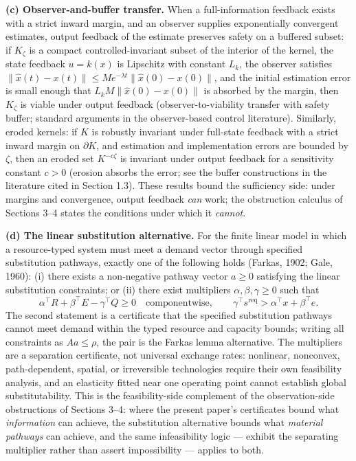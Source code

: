 \documentclass[11pt]{article}
\theoremstyle{definition}
\begin{document}
\textbf{(c) Observer-and-buffer transfer.} When a full-information
feedback exists with a strict inward margin, and an observer supplies
exponentially convergent estimates, output feedback of the estimate
preserves safety on a buffered subset: if \(K_\zeta\) is a compact controlled-invariant subset of the interior of the kernel, the state
feedback \(u = k(x)\) is Lipschitz with constant \(L_k\), the observer satisfies \(\|\hat x(t) - x(t)\| \le M e^{-\lambda t}\|\hat x(0) - x(0)\|\), and
the initial estimation error is small enough that
\(L_k M \|\hat x(0) - x(0)\|\) is absorbed by the margin, then \(K_\zeta\) is viable under output feedback (observer-to-viability
transfer with safety buffer; standard arguments in the observer-based
control literature). Similarly, eroded kernels: if \(K\) is robustly
invariant under full-state feedback with a strict inward margin on
\(\partial K\), and estimation and implementation errors are bounded by \(\zeta\), then an eroded set \(K^{-c\zeta}\) is invariant
under output feedback for a sensitivity constant \(c > 0\) (erosion
absorbs the error; see the buffer constructions in the literature cited in Section 1.3). These results bound the sufficiency side: under margins and convergence, output feedback \emph{can} work; the obstruction calculus
of Sections 3--4 states the conditions under which it \emph{cannot}.

\textbf{(d) The linear substitution alternative.} For the finite linear
model in which a resource-typed system must meet a demand vector through specified substitution pathways, exactly one of the following holds
(Farkas, 1902; Gale, 1960): (i) there exists a non-negative pathway
vector \(a \ge 0\) satisfying the linear substitution constraints; or
(ii) there exist multipliers \(\alpha, \beta, \gamma \ge 0\) such that
\[\alpha^\top R + \beta^\top E - \gamma^\top Q \ge 0 \quad\text{componentwise},\qquad \gamma^\top s^{\mathrm{req}} > \alpha^\top x + \beta^\top e.\]
The second statement is a certificate that the specified substitution pathways cannot meet demand within the typed resource and capacity
bounds; writing all constraints as \(Aa \le \rho\), the pair is the Farkas lemma alternative. The multipliers are a separation
certificate, not universal exchange rates: nonlinear, nonconvex,
path-dependent, spatial, or irreversible technologies require their own
feasibility analysis, and an elasticity fitted near one operating point
cannot establish global substitutability. This is the feasibility-side
complement of the observation-side obstructions of Sections 3--4: where
the present paper's certificates bound what \emph{information} can
achieve, the substitution alternative bounds what \emph{material
pathways} can achieve, and the same infeasibility logic --- exhibit the separating multiplier rather than assert impossibility --- applies to both.
\end{document}
